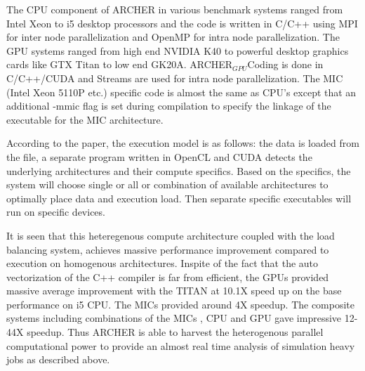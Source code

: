 \documentclass[a4paper,12 pt]{article}
\begin{document}
The CPU component of ARCHER in various benchmark systems ranged from Intel Xeon to i5 desktop processors and the code is written in C/C++ using MPI for inter node parallelization and OpenMP for intra node parallelization. The GPU systems ranged from high end NVIDIA K40 to powerful desktop graphics cards like GTX Titan to low end GK20A. ARCHER$_{GPU}$Coding is done in C/C++/CUDA and Streams are used for intra node parallelization. The MIC (Intel Xeon 5110P etc.) specific code is almost the same as CPU's except that an additional -mmic flag is set during compilation to specify the linkage of the executable for the MIC architecture.

According to the paper, the execution model is as follows: the data is loaded from the file, a separate program written in OpenCL and CUDA detects the underlying architectures and their compute specifics. Based on the specifics, the system will choose single or all or combination of available architectures to optimally place data and execution load. Then separate specific executables will run on specific devices.

It is seen that this heteregenous compute architecture coupled with the load balancing system, achieves massive performance improvement compared to execution on homogenous architectures. Inspite of the fact that the auto vectorization of the C++ compiler is far from efficient, the GPUs provided massive average improvement with the TITAN at 10.1X speed up on the base performance on i5 CPU. The MICs provided around 4X speedup. The composite systems including combinations of the MICs , CPU and GPU gave impressive 12-44X speedup. Thus ARCHER is able to harvest the heterogenous parallel computational power to provide an almost real time analysis of simulation heavy jobs as described above. 
\end{document}
